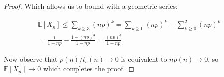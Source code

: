 \documentclass[11pt]{article}
\begin{document}
\begin{proof}
    Which allows us to bound with a geometric series:

    \begin{align*}
        \mathbb{E}[X_n] \leq  \sum_{k \geq 3} (n p)^k = \sum_{k \geq 0} (n p)^k - \sum_{k \geq 0}^2 (n p)^k \\
        = \frac{1}{1 - np} - \frac{1 - (np)^3}{1-np} = \frac{(np)^3}{1-np}.
    \end{align*}

    Now observe that ${p(n)}/{t_c(n)} \rightarrow 0$ is equivalent to $np(n) \rightarrow 0$, so $\mathbb{E}[X_n] \rightarrow 0$ which completes the proof.

\end{proof}
\end{document}
